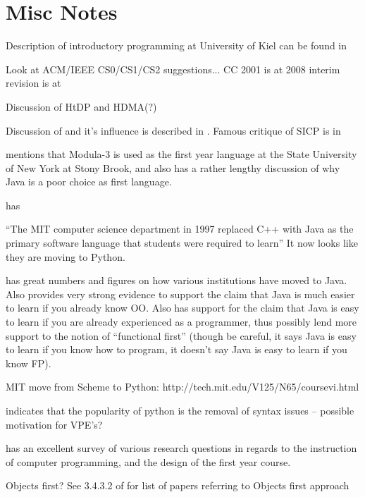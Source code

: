 \label{chapter:problem}

\section{Misc Notes}

Description of introductory programming at University of Kiel can be found in \cite{Huch05}

Look at ACM/IEEE CS0/CS1/CS2 suggestions...  CC 2001 is at \cite{cc2001} 2008 interim revision is at \cite{cs2008}

Discussion of HtDP and HDMA(?)

Discussion of \cite{SICPbook} and it's influence is described in \cite{Flatt04}.  Famous critique of SICP is in \cite{Wadler87}

\cite{Bos98} mentions that Modula-3 is used as the first year language at the State University of New York at Stony Brook, and also has a rather lengthy discussion of why Java is a poor choice as first language.

\cite{Mahmoud04} has 


``The MIT computer science department in 1997 replaced C++ with Java as the primary software language that students were required to learn'' \cite{Benander04}  It now looks like they are moving to Python.

\cite{Benander04} has great numbers and figures on how various institutions have moved to Java.  Also provides very strong evidence to support the claim that Java is much easier to learn if you already know OO.  Also has support for the claim that Java is easy to learn if you are already experienced as a programmer, thus possibly lend more support to the notion of ``functional first'' (though be careful, it says Java is easy to learn if you know how to program, it doesn't say Java is easy to learn if you know FP).


MIT move from Scheme to Python: http://tech.mit.edu/V125/N65/coursevi.html

\cite{Necaise08} indicates that the popularity of python is the removal of syntax issues -- possible motivation for VPE's?

\cite{Pears07} has an excellent survey of various research questions in regards to the instruction of computer programming, and the design of the first year course.





Objects first?  See 3.4.3.2 of \cite{Pears07} for list of papers referring to Objects first approach

